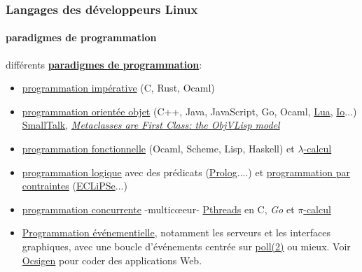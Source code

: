 \documentclass[xcolor=svgnames,final,smaller,a4]{beamer}
\begin{document}
\begin{frame}
  \frametitle{Langages des développeurs Linux}
  \framesubtitle{paradigmes de programmation}
  différents \href{https://fr.wikipedia.org/wiki/Paradigme_(programmation)}{\textbf{paradigmes de programmation}}:

  \begin{itemize}
  \item \href{https://fr.wikipedia.org/wiki/Programmation_impérative}{programmation impérative} (C, Rust, Ocaml)
    
    \item \href{https://fr.wikipedia.org/wiki/Programmation_orienté_objet}{programmation orientée objet} (C++, Java, JavaScript, Go, Ocaml, \href{http://lua.org/}{Lua}, \href{https://iolanguage.org/}{Io}...) \href{https://fr.wikipedia.org/wiki/Smalltalk}{SmallTalk}, \href{http://stephane.ducasse.free.fr/Teaching/Archives/STOBJ/allPapers.pdf}{\textit{Metaclasses are First Class: the ObjVLisp model}}

    \item
      \href{https://fr.wikipedia.org/wiki/Programmation_fonctionnelle}{programmation
        fonctionnelle} (Ocaml, Scheme, Lisp, Haskell) et
      \href{https://fr.wikipedia.org/wiki/Lambda-calcul}{$\lambda$-calcul}

      
    \item
      \href{https://fr.wikipedia.org/wiki/Programmation_logique}{programmation
        logique} avec des prédicats
      (\href{https://fr.wikipedia.org/wiki/Prolog}{Prolog}....) et
      \href{https://fr.wikipedia.org/wiki/Programmation_par_contraintes}{programmation
        par contraintes} (\href{https://eclipseclp.org/}{ECLiPSe}...)

    \item
      \href{https://fr.wikipedia.org/wiki/Programmation_concurrente}{programmation
        concurrente} -multic{\oe}eur-
      \href{https://computing.llnl.gov/tutorials/pthreads/}{Pthreads}
      en C, \textit{Go} et
      \href{https://fr.wikipedia.org/wiki/Pi-calcul}{$\pi$-calcul}

    \item
      \href{https://fr.wikipedia.org/wiki/Programmation_événementielle}{Programmation
        événementielle}, notamment les serveurs et les interfaces
      graphiques, avec une boucle d'événements centrée sur
      \href{https://man7.org/linux/man-pages/man2/poll.2.html}{poll(2)}
      ou mieux. Voir \href{https://ocsigen.org/}{Ocsigen} pour coder des applications Web.
      
\end{itemize}

\end{frame}
\end{document}
